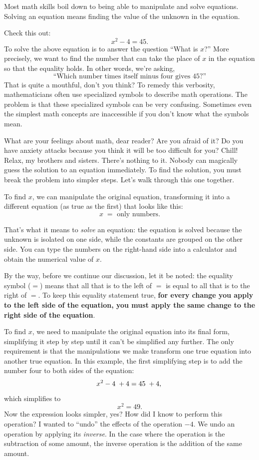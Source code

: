 	Most math skills boil down to being able to manipulate and solve equations.
	Solving an equation means finding the value of the unknown in the equation.  

	Check this  out:
	\[
	 x^2-4=45.
	\]
	To solve the above equation is to answer
	the question ``What is $x$?''
	More precisely, we want to find the number that can take the 
	place of $x$ in the equation so that the equality holds.
	In other words, we're asking,
	\[
	  \text{``Which number times itself minus four gives 45?''}
	\]
	That is quite a mouthful, don't you think? 
	To remedy this verbosity, mathematicians often use specialized symbols to describe math operations.
	The problem is that these specialized symbols can be very confusing. 
	Sometimes even the simplest math concepts are inaccessible if you don't know what the symbols mean. 

	What are your feelings about math, dear reader? Are you afraid of it? 
	Do you have anxiety attacks because you think it will be too difficult for you?
	Chill! Relax, my brothers and sisters. There's nothing to it.
	Nobody can magically guess the solution to an equation immediately.
	To find the solution, you must break the problem into simpler steps.
	Let's walk through this one together.

	To find $x$, we can manipulate the original equation, 
	transforming it into a different equation (as true as the first) that looks like this:
	\[
	  x \; = \textrm{ only numbers.}
	\]

	\noindent
	That's what it means to \emph{solve} an equation:
	the equation is solved because the unknown is isolated on one side,
	while the constants are grouped on the other side.
	You can type the numbers on the right-hand side into a calculator and obtain the numerical value of $x$.

	By the way, before we continue our discussion,
	let it be noted: the equality symbol ($=$) means that all that is to the left of $=$ 
	is equal to 
	all that is to the right of $=$. 
	To keep this equality statement true,  
	\textbf{for every change you apply to the left side of the equation, 
	you must apply the same change to the right side of the equation}.

		To find $x$,
	we need to manipulate the original equation into its final form,
	simplifying it step by step until it can't be simplified any further.
	The only requirement is that the manipulations we make transform one true equation into another true equation.
	In this example,
	the first simplifying step is to add the number four to both sides of the equation:
	\[
	 	x^2-4  \; + 4  	=	45    \; + 4, 	    \\
	\]
	which simplifies to
	\[
		x^2 	 		=	49.
	\]
	Now the expression looks simpler, yes?
	How did I know to perform this operation? 
	I wanted to ``undo'' the effects of the operation $-4$.
	We undo an operation by applying its \emph{inverse}.
	In the case where the operation is the subtraction of some amount,
	the inverse operation is the addition of the same amount.

